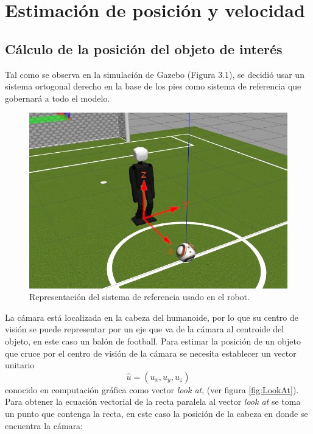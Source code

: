 \documentclass{book}
\begin{document}
\chapter{Estimación de posición y velocidad}
	\section{Cálculo de la posición del objeto de interés}
Tal como se observa en la simulación de Gazebo (Figura 3.1), se decidió usar un sistema ortogonal derecho en la base de los pies como sistema de referencia que gobernará a todo el modelo.

\begin{figure}
	\centering		
	\includegraphics[scale=2]{images/robot_ejes.png}
	\caption{Representación del sistema de referencia usado en el robot.}		
\end{figure}

La cámara está localizada en la cabeza del humanoide, por lo que su centro
de visión se puede representar por un eje que va de la cámara al centroide del 
objeto, en este caso un balón de football.
Para estimar la posición de un objeto que cruce por el centro de visión de la
cámara se necesita establecer un vector unitario
\[\hat{u} = (u_x, u_y, u_z)\]
conocido en computación gráfica como vector \textit{look at}, (ver figura \ref{fig:LookAt}). Para obtener la ecuación vectorial de la recta paralela al vector \textit{look at} se toma un punto que contenga la recta, en este caso la posición de la cabeza en donde se encuentra la cámara: 
\end{document}
